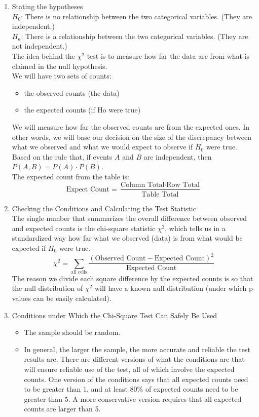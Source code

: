 \documentclass[10pt, a4paper]{article}
\begin{document}
\begin{enumerate}
\item Stating the hypotheses\\
$H_0$: There is no relationship between the two categorical variables. (They are independent.)\\
$H_a$: There is a relationship between the two categorical variables. (They are not independent.)\\
The idea behind the $\chi^2$ test is to measure how far the data are from what is claimed in the null hypothesis.\\
We will have two sets of counts:
\begin{itemize}
\item the observed counts (the data)
\item the expected counts (if Ho were true)
\end{itemize}
We will measure how far the observed counts are from the expected ones. In other words, we will base our decision on the size of the discrepancy between what we observed and what we would expect to observe if $H_0$ were true. Based on the rule that,  if events $A$ and $B$ are independent, then $P(A, B) = P(A) \cdot P(B)$.\\
The expected count from the table is:
\[
    \text{Expect Count} = \frac{\text{Column Total} \cdot \text{Row Total}}
    {\text{Table Total}}
\]
\item Checking the Conditions and Calculating the Test Statistic \\
The single number that summarizes the overall difference between observed and expected counts is the chi-square statistic $\chi^2$, which tells us in a standardized way how far what we observed (data) is from what would be expected if $H_0$ were true.
\[
    \chi^2 = \sum_{\text{all cells}}\frac{(\text{Observed Count} - \text{Expected Count})^2}
    {\text{Expected Count}}
\]
The reason we divide each square difference by the expected counts is so that the null distribution of $\chi^2$ will have a known null distribution (under which p-values can be easily calculated).
\item Conditions under Which the Chi-Square Test Can Safely Be Used
\begin{itemize}
    \item The sample should be random.
    \item In general, the larger the sample, the more accurate and reliable the test results are. There are different versions of what the conditions are that will ensure reliable use of the test, all of which involve the expected counts. One version of the conditions says that all expected counts need to be greater than 1, and at least $80\%$ of expected counts need to be greater than 5. A more conservative version requires that all expected counts are larger than 5.

\end{itemize}
\end{enumerate}
\end{document}
